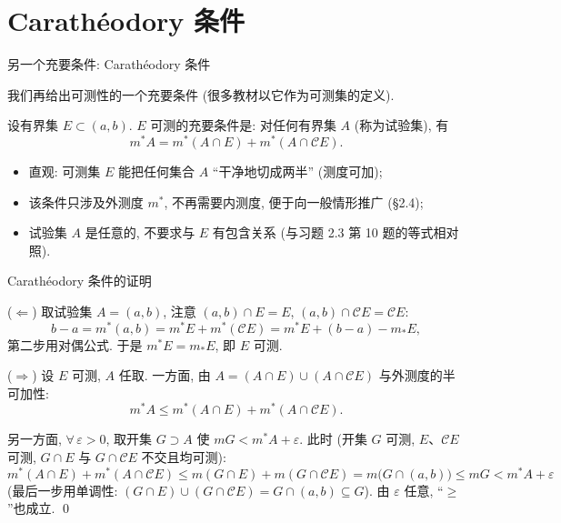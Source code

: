 
\section[卡氏条件]{Carath\'{e}odory 条件}


\begin{frame}{另一个充要条件: Carath\'{e}odory 条件}

我们再给出可测性的一个充要条件 (很多教材\alert{以它作为可测集的定义}).

\pause

\begin{thm}
设有界集 $E \subset (a, b)$. $E$ 可测的充要条件是: 对\alert{任何}有界集 $A$ (称为\alert{试验集}), 有
\[
m^* A = m^* (A \cap E) + m^* (A \cap \mathscr{C}E) .
\]
\end{thm}

\pause

\begin{remark}
\begin{itemize}
\item 直观: 可测集 $E$ 能把\alert{任何}集合 $A$ ``干净地切成两半'' (测度可加);
\item 该条件\alert{只涉及外测度} $m^*$, 不再需要内测度, 便于向一般情形推广 (§2.4);
\item 试验集 $A$ 是\alert{任意}的, 不要求与 $E$ 有包含关系 (与习题 2.3 第 10 题的等式相对照).
\end{itemize}
\end{remark}

\end{frame}


\begin{frame}{Carath\'{e}odory 条件的证明}

\startproof[bg=yellow, fg=red]($\Longleftarrow$)
取试验集 $A = (a, b)$, 注意 $(a,b) \cap E = E$, $(a,b) \cap \mathscr{C}E = \mathscr{C}E$:
\[
b - a = m^* (a, b) = m^* E + m^* (\mathscr{C}E)
= m^* E + (b - a) - m_* E ,
\]
第二步用对偶公式. 于是 $m^* E = m_* E$, 即 $E$ 可测.

\pause
\vspace{1em}

\startproof[bg=yellow, fg=red]($\Longrightarrow$)
设 $E$ 可测, $A$ 任取. 一方面, 由 $A = (A \cap E) \cup (A \cap \mathscr{C}E)$ 与外测度的半可加性:
\[
m^* A \leqslant m^* (A \cap E) + m^* (A \cap \mathscr{C}E) .
\]

\pause

另一方面, $\forall\, \varepsilon > 0$, 取开集 $G \supset A$ 使 $mG < m^* A + \varepsilon$. 此时 (开集 $G$ 可测, $E$、$\mathscr{C}E$ 可测, $G \cap E$ 与 $G \cap \mathscr{C}E$ \alert{不交}且均可测):
\[
m^* (A \cap E) + m^* (A \cap \mathscr{C}E)
\leqslant m(G \cap E) + m(G \cap \mathscr{C}E)
= m\big(G \cap (a,b)\big) \leqslant m G < m^* A + \varepsilon
\]
(最后一步用单调性: $(G \cap E) \cup (G \cap \mathscr{C}E) = G \cap (a,b) \subseteq G$).
由 $\varepsilon$ 任意, ``$\geqslant$''也成立.
\qed

\end{frame}

